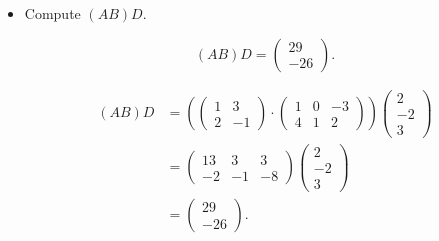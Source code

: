 \begin{Exercise}
\begin{itemize}
		\item Compute $(A B)D$.
		\begin{answer}
			$$
			(AB)D = \begin{pmatrix}
			29 \\
			-26
			\end{pmatrix}.
			$$
		\end{answer}
		\begin{solution}
			\begin{align*}
			(AB)D
			&= \left( \begin{pmatrix}
			1 & 3 \\
			2 & -1
			\end{pmatrix} \cdot \begin{pmatrix}
			1 & 0 & -3 \\
			4 & 1 & 2
			\end{pmatrix} \right) \begin{pmatrix}
			2 \\
			-2 \\
			3
			\end{pmatrix} \\
			&= \begin{pmatrix}
			13 & 3 & 3 \\
			-2 & -1 & -8
			\end{pmatrix} \begin{pmatrix}
			2 \\
			-2 \\
			3
			\end{pmatrix} \\
			&= \begin{pmatrix}
			29 \\
			-26
			\end{pmatrix}.
			\end{align*}
		\end{solution}
		

\end{itemize}
\end{Exercise}
